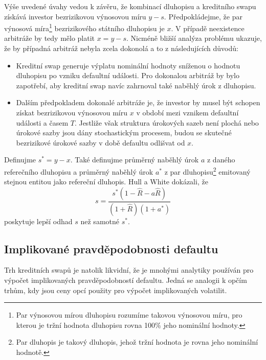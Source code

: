 \documentclass[a4paper]{book}
\begin{document}
Výše uvedené úvahy vedou k závěru, že kombinací dluhopisu a kreditního swapu získává investor bezrizikovou výnosovou míru $y - s$. Předpokládejme, že par výnosová míra\footnote{Par výnosovou mírou dluhopisu rozumíme takovou výnosovou míru, pro kterou je tržní hodnota dluhopisu rovna 100\% jeho nominální hodnoty.} bezrizikového státního dluhopisu je $x$. V případě neexistence arbitráže by tedy mělo platit $x = y - s$. Nicméně bližší analýza problému ukazuje, že by případná arbitráž nebyla zcela dokonolá a to z následujících důvodů:
\begin{itemize}
\item Kreditní swap generuje výplatu nominální hodnoty sníženou o hodnotu dluhopisu po vzniku defaultní události. Pro dokonalou arbitráž by bylo zapotřebí, aby kreditní swap navíc zahrnoval také naběhlý úrok z dluhopisu.
\item Dalším předpokladem dokonalé arbitráže je, že investor by musel být schopen získat bezrizikovou výnosovou míru $x$ v období mezi vznikem defaultní události a časem $T$. Jestliže však struktura úrokových sazeb není plochá nebo úrokové sazby jsou dány stochastickým procesem, budou se skutečné bezrizikové úrokové sazby v době defaultu odlišvat od $x$.
\end{itemize}
Definujme $s^* = y - x$. Také definujme průměrný naběhlý úrok $a$ z daného referečního dluhopisu a průměrný naběhlý úrok $a^*$ z par dluhopisu\footnote{Par dluhopis je takový dluhopis, jehož tržní hodnota je rovna jeho nominální hodnotě.} emitovaný stejnou entitou jako refereční dluhopis. Hull a White dokázali, že
\begin{equation*}
s = \frac{s^*(1 - \hat{R} -a\hat{R})}{(1 + \hat{R})(1 + a^*)}
\end{equation*}
poskytuje lepší odhad $s$ než samotné $s^*$.

\subsection{Implikované pravděpodobnosti defaultu}

Trh kreditních swapů je natolik likvidní, že je mnohými analytiky používán pro výpočet implikovaných pravděpodobností defaultu. Jedná se analogii k opčím trhům, kdy jsou ceny opcí použity pro výpočet implikovaných volatilit.
\end{document}
